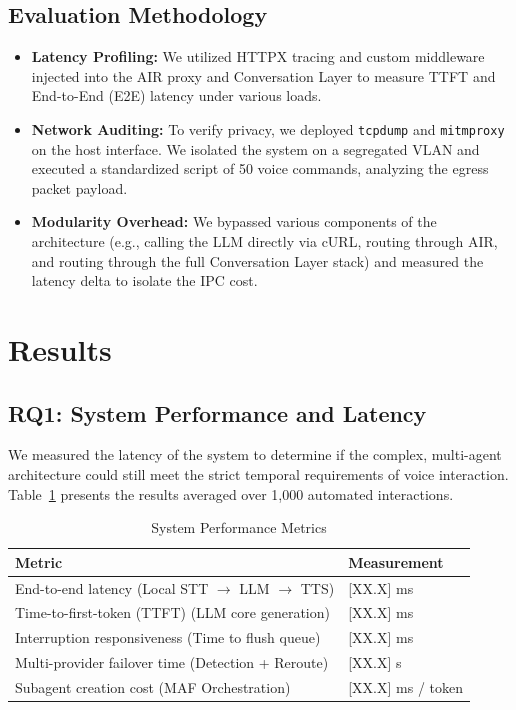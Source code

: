 \documentclass[conference]{IEEEtran}
\begin{document}
\subsection{Evaluation Methodology}
\begin{itemize}
    \item \textbf{Latency Profiling:} We utilized HTTPX tracing and custom middleware injected into the AIR proxy and Conversation Layer to measure TTFT and End-to-End (E2E) latency under various loads.
    \item \textbf{Network Auditing:} To verify privacy, we deployed \texttt{tcpdump} and \texttt{mitmproxy} on the host interface. We isolated the system on a segregated VLAN and executed a standardized script of 50 voice commands, analyzing the egress packet payload.
    \item \textbf{Modularity Overhead:} We bypassed various components of the architecture (e.g., calling the LLM directly via cURL, routing through AIR, and routing through the full Conversation Layer stack) and measured the latency delta to isolate the IPC cost.
\end{itemize}

\section{Results}

\subsection{RQ1: System Performance and Latency}
We measured the latency of the system to determine if the complex, multi-agent architecture could still meet the strict temporal requirements of voice interaction. Table~\ref{tab:performance} presents the results averaged over 1,000 automated interactions.

\begin{table}[htbp]
\caption{System Performance Metrics}
\begin{center}
\begin{tabular}{|l|l|}
\hline
\textbf{Metric} & \textbf{Measurement} \\
\hline
End-to-end latency (Local STT $\rightarrow$ LLM $\rightarrow$ TTS) & [XX.X] ms \\
\hline
Time-to-first-token (TTFT) (LLM core generation) & [XX.X] ms \\
\hline
Interruption responsiveness (Time to flush queue) & [XX.X] ms \\
\hline
Multi-provider failover time (Detection + Reroute) & [XX.X] s \\
\hline
Subagent creation cost (MAF Orchestration) & [XX.X] ms / token \\
\hline
\end{tabular}
\label{tab:performance}
\end{center}
\end{table}
\end{document}
